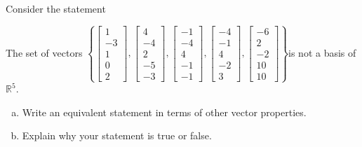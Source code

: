 
\begin{exerciseStatement}


Consider the statement 
\begin{center}\begin{minipage}{0.8\textwidth}
 The set of vectors \( \left\{ \left[\begin{array}{c}
1 \\
-3 \\
1 \\
0 \\
2
\end{array}\right] , \left[\begin{array}{c}
4 \\
-4 \\
2 \\
-5 \\
-3
\end{array}\right] , \left[\begin{array}{c}
-1 \\
-4 \\
4 \\
-1 \\
-1
\end{array}\right] , \left[\begin{array}{c}
-4 \\
-1 \\
4 \\
-2 \\
3
\end{array}\right] , \left[\begin{array}{c}
-6 \\
2 \\
-2 \\
10 \\
10
\end{array}\right] \right\} \)is not a basis of \(\mathbb{R}^5\). 
\end{minipage}\end{center}
    


\begin{enumerate}[(a)]
\item  Write an equivalent statement in terms of other vector properties.
\item  Explain why your statement is true or false.
\end{enumerate}
    
\end{exerciseStatement}
    
